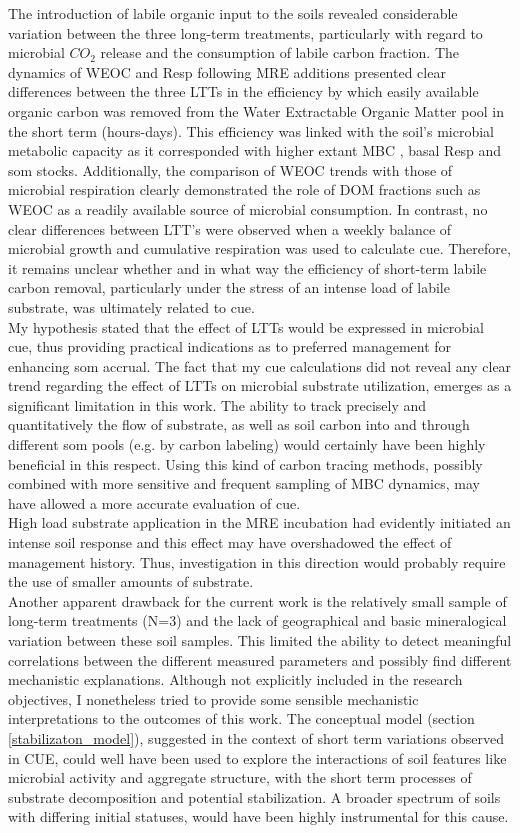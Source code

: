 The introduction of labile organic input to the soils revealed considerable variation between the three long-term treatments, particularly with regard to microbial $ CO_2 $ release and the consumption of labile carbon fraction. The dynamics of WEOC and Resp following MRE additions presented clear differences between the three LTTs in the efficiency by which easily available organic carbon was removed from the Water Extractable Organic Matter pool in the short term (hours-days). This efficiency was linked with the soil's microbial metabolic capacity as it corresponded with higher extant MBC , basal Resp and \gls{som} stocks. Additionally, the comparison of WEOC trends with those of microbial respiration clearly demonstrated the role of DOM fractions such as WEOC as a readily available source of microbial consumption. In contrast, no clear differences between LTT's were observed when a weekly balance of microbial growth and cumulative respiration was used to calculate \gls{cue}. Therefore, it remains unclear whether and in what way the efficiency of short-term labile carbon removal, particularly under the stress of an intense load of labile substrate, was ultimately related to \gls{cue}.\\
My hypothesis stated that the effect of LTTs would be expressed in microbial \gls{cue}, thus providing practical indications as to preferred management for enhancing \gls{som} accrual. The fact that my \gls{cue} calculations did not reveal any clear trend regarding the effect of  LTTs on microbial substrate utilization, emerges as a significant limitation in this work. The ability to track precisely and quantitatively the flow of substrate, as well as soil carbon into and through different \gls{som} pools (e.g. by carbon labeling) would certainly have been highly beneficial in this respect. Using this kind of carbon tracing methods, possibly combined with more sensitive and frequent sampling of MBC dynamics, may have allowed a more accurate evaluation of \gls{cue}.\\
High load substrate application in the MRE incubation had evidently initiated an intense soil response and this effect may have overshadowed the effect of management history. Thus, investigation in this direction would probably require the use of smaller amounts of substrate. \\
Another apparent drawback for the current work is the relatively small sample of long-term treatments (N=3) and the lack of geographical and basic mineralogical variation between these soil samples. This limited the ability to detect meaningful correlations between the different measured parameters and possibly find different mechanistic explanations. Although not explicitly included in the research objectives, I nonetheless tried to provide some sensible mechanistic interpretations to the outcomes of this work. The conceptual model (section \ref{stabilizaton_model}), suggested in the context of short term variations observed in CUE, could well have been used to explore the interactions of soil features like microbial activity and aggregate structure, with the short term processes of substrate decomposition and potential stabilization. A broader spectrum of soils with differing initial statuses, would have been highly instrumental for this cause. 

